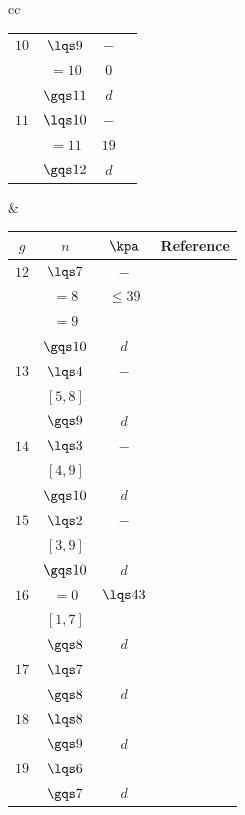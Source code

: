 \documentclass[a4paper, twoside]{article}
\begin{document}
\begin{table}[H]
\begin{tabular}{cc}
\begin{tabular}[t]{cccc}
		  	\hline
		  	$10$& $\lqs9$  & $-$ & \cite{FP2005Effective} \\
				& $=10$ & $0$ & \cite{FP2005Effective} \\
				& $\gqs11$ & $d$ & \cite{FP2005Effective} \\
		  	\hline
		  	$11$& $\lqs10$ & $-$ & \cite{Logan2003} \\
				& $=11$ & $19$& \cite{Logan2003} \\
				& $\gqs12$ & $d$ & \cite{Farkas2009} \\
		  	\bottomrule
		\end{tabular} &
		\begin{tabular}[t]{cccc}
		  	\toprule
		  	$g$ & $n$   & $\kpa$ & Reference \\
		  	\midrule
		  	$12$& $\lqs7$  & $-$ & \cite{AB2021} \\
				& $=8$  & $\leq39$ & \cite{AB2021} \\
				& $=9$  & \red{NK} & \\
				& $\gqs10$ & $d$ & \cite{Kadikoylu2020} \\
		  	\hline
		  	$13$& $\lqs4$  & $-$ & \cite{AB2021} \\
				& $[5,8]$ & \red{NK} & \\
				& $\gqs9$  & $d$ & \cite{FJP2021} \\
		  	\hline
			$14$& $\lqs3$  & $-$ & \cite{AB2021} \\
				& $[4,9]$ & \red{NK} & \\
				& $\gqs10$ & $d$ & \cite{AB2021} \\
		  	\hline
		  	$15$& $\lqs2$  & $-$ & \cite{AB2021} \\
				& $[3,9]$ & \red{NK} & \\
				& $\gqs10$ & $d$ & \cite{AB2021} \\
		  	\hline
		  	$16$& $=0$  & $\lqs43$ & \cite{AB2021} \\
				& $[1,7]$ & \red{NK} & \\
				& $\gqs8$ & $d$ & \cite{Kadikoylu2020} \\
		  	\hline
			$17$& $\lqs7$ & \red{NK} & \\
				& $\gqs8$ & $d$ & \cite{Kadikoylu2020} \\
		  	\hline
		  	$18$& $\lqs8$ & \red{NK} & \\
				& $\gqs9$ & $d$ & \cite{Farkas2009} \\
		  	\hline
			$19$& $\lqs6$ & \red{NK} & \\
				& $\gqs7$ & $d$ & \cite{Farkas2009} \\

\end{tabular}
\end{tabular}
\end{table}
\end{document}

